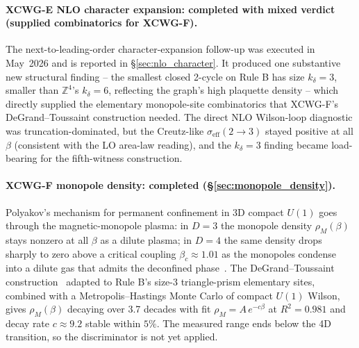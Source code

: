 \documentclass[11pt]{article}
\begin{document}
\paragraph{XCWG-E NLO character expansion: completed with mixed verdict
(supplied combinatorics for XCWG-F).} The next-to-leading-order
character-expansion follow-up was executed in May~2026 and is reported in
\S\ref{sec:nlo_character}. It produced one substantive new structural
finding -- the smallest closed 2-cycle on Rule B has size $k_\delta=3$,
smaller than $\mathbb{Z}^4$'s $k_\delta=6$, reflecting the graph's high
plaquette density -- which directly supplied the elementary monopole-site
combinatorics that XCWG-F's DeGrand--Toussaint construction needed. The
direct NLO Wilson-loop diagnostic was truncation-dominated, but the
Creutz-like $\sigma_\text{eff}(2\to 3)$ stayed positive at all $\beta$
(consistent with the LO area-law reading), and the $k_\delta=3$ finding
became load-bearing for the fifth-witness construction.

\paragraph{XCWG-F monopole density: completed
(\S\ref{sec:monopole_density}).} Polyakov's mechanism for permanent
confinement in 3D compact $U(1)$ goes through the magnetic-monopole plasma:
in $D=3$ the monopole density $\rho_M(\beta)$ stays nonzero at all $\beta$
as a dilute plasma; in $D=4$ the same density drops sharply to zero above
a critical coupling $\beta_c\approx 1.01$ as the monopoles condense into a
dilute gas that admits the deconfined phase~\cite{guth1980,polyakov1977}.
The DeGrand--Toussaint construction~\cite{degrand_toussaint1980} adapted
to Rule B's size-3 triangle-prism elementary sites, combined with a
Metropolis--Hastings Monte Carlo of compact $U(1)$ Wilson, gives
$\rho_M(\beta)$ decaying over 3.7 decades with fit $\rho_M=A\,e^{-c\beta}$
at $R^2=0.981$ and decay rate $c\approx 9.2$ stable within $5\%$.  The
measured range ends below the 4D transition, so the discriminator is not
yet applied.
\end{document}
